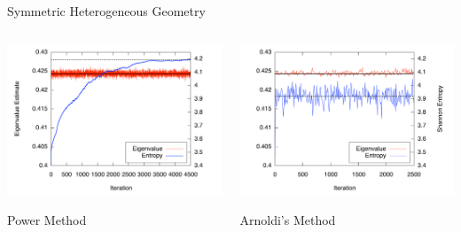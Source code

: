 \documentclass[xcolor={usenames, dvipsnames},]{beamer}
\begin{document}
\begin{frame}{Symmetric Heterogeneous Geometry}
\begin{columns}[t,onlytextwidth]
    \begin{column}{0.5\textwidth}
        \includegraphics[width=1.1\textwidth,keepaspectratio]{Figures/SymmetricPower}
        \begin{center} \hspace{6ex}Power Method \end{center}
    \end{column}
    \begin{column}{0.5\textwidth}
        \includegraphics[width=1.1\textwidth,keepaspectratio]{Figures/SymmetricArnoldi}
        \begin{center} \hspace{2ex}Arnoldi's Method \end{center}
    \end{column}
\end{columns}
\end{frame}
\end{document}
